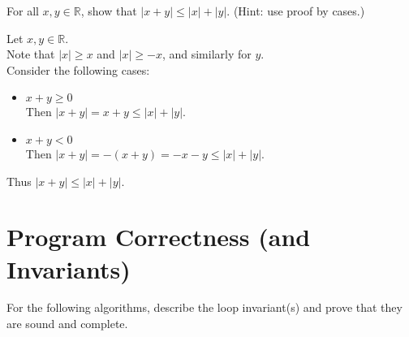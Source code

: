 \documentclass[solutionorbox,answers]{exam}
\begin{document}
\begin{questions}
\question
For all $x,y \in \mathbb{R}$, show that $|x + y| \le |x| + |y|$. (Hint: use proof by cases.)
\begin{solutionbox}{3in}
  Let $x,y \in \mathbb{R}$. \\
  Note that $|x| \ge x$ and $|x| \ge -x$, and similarly for $y$. \\
  Consider the following cases: \\
  \begin{itemize}
    \item $x + y \ge 0$ \\
      Then $|x + y| = x + y \le |x| + |y|$. 
    \item $x + y < 0$ \\
      Then $|x + y| = -(x + y) = -x - y \le |x| + |y|$.
  \end{itemize}
  Thus $|x + y| \le |x| + |y|$.
\end{solutionbox}

\section*{Program Correctness (and Invariants)}
\label{sec:program-correctness}

\question
For the following algorithms, describe the loop invariant(s) and prove that they are sound and complete.
\begin{parts}

\end{parts}
\end{questions}
\end{document}
